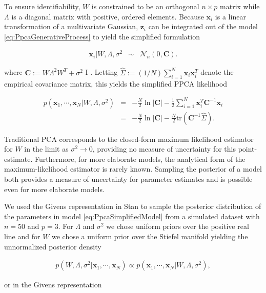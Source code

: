 \documentclass[ba]{imsart}
\newcommand{\mb}[1]{\mathbf{#1}}
\numberwithin{equation}{section}
\theoremstyle{plain}
\begin{document}
\noindent To ensure identifiability, $W$ is constrained to be an orthogonal $n \times p$ matrix while $\Lambda$ is a diagonal matrix with positive, ordered elements. Because $\mb{x}_i$ is a linear transformation of a multivariate Gaussian, $\mb{z}_i$ can be integrated out of the model \ref{eq:PpcaGenerativeProcess} to yield the simplified formulation

\begin{eqnarray}
\label{eq:PpcaSimplifiedModel}
\mb{x}_i | W, \Lambda, \sigma^2 &\sim& \mathcal{N}_n(0, \textbf{C}).
\end{eqnarray}

\noindent where $\textbf{C} := W \Lambda^2 W^T + \sigma^2$ I \citep{murphy2012machine}. Letting $\hat{\Sigma} := (1/N) \sum_{i=1}^N \mb{x}_i \mb{x}_i^T$ denote the empirical covariance matrix, this yields the simplified PPCA likelihood

\begin{eqnarray}
p(\mb{x}_1, \cdots, \mb{x}_N | W, \Lambda, \sigma^2) &=& -\frac{N}{2} \ln |\textbf{C}| - \frac{1}{2} \sum_{i=1}^N \mb{x}_i^T \textbf{C}^{-1} \mb{x}_i\\
&=& -\frac{N}{2} \ln |\textbf{C}| - \frac{N}{2} \mathrm{tr} (\textbf{C}^{-1} \hat{\Sigma}).
\label{eq:ppca_likelihood}
\end{eqnarray}

\noindent Traditional PCA corresponds to the closed-form maximum likelihood estimator for $W$ in the limit as $\sigma^2 \to 0$,  providing no measure of uncertainty for this point-estimate. Furthermore, for more elaborate models, the analytical form of the maximum-likelihood estimator is rarely known. Sampling the posterior of a model both provides a measure of uncertainty for parameter estimates and is possible even for more elaborate models.

\noindent We used the Givens representation in Stan to sample the posterior distribution of the parameters in model \ref{eq:PpcaSimplifiedModel} from a simulated dataset with $n = 50$ and $p = 3$. For  $\Lambda$ and $\sigma^2$ we chose uniform priors over the positive real line and for $W$ we chose a uniform prior over the Stiefel manifold yielding the unnormalized posterior density

\begin{eqnarray}
p(W, \Lambda, \sigma^2 | \mb{x}_1, \cdots, \mb{x}_N) \propto p(\mb{x}_1, \cdots, \mb{x}_N | W, \Lambda, \sigma^2),
\end{eqnarray}

\noindent or in the Givens representation
\end{document}
